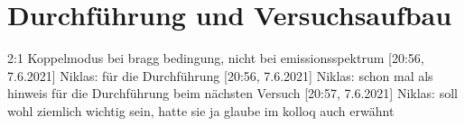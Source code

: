 \newpage
\section{Durchführung und Versuchsaufbau}





2:1 Koppelmodus bei bragg bedingung, nicht bei emissionsspektrum
[20:56, 7.6.2021] Niklas: für die Durchführung
[20:56, 7.6.2021] Niklas: schon mal als hinweis für die Durchführung beim nächsten Versuch
[20:57, 7.6.2021] Niklas: soll wohl ziemlich wichtig sein, hatte sie ja glaube im kolloq auch erwähnt